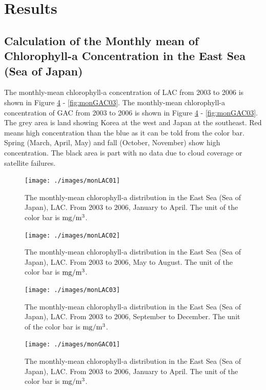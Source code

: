 \section{Results}

\subsection{Calculation of the Monthly mean of Chlorophyll-a Concentration in the East Sea (Sea of Japan)}
The monthly-mean chlorophyll-a concentration of LAC from 2003 to 2006 is shown in Figure \ref{fig:monGAC01} - \ref{fig:monGAC03}. The monthly-mean chlorophyll-a concentration of GAC from 2003 to 2006 is shown in Figure \ref{fig:monGAC01} - \ref{fig:monGAC03}. The grey area is land showing Korea at the west and Japan at the southeast. Red means high concentration than the blue as it can be told from the color bar. Spring (March, April, May) and fall (October, November) show high concentration. The black area is part with no data due to cloud coverage or satellite failures. 

\begin{figure}[p]
	\centering
	\texttt{[image: ./images/monLAC01]}\\
	\caption{The monthly-mean chlorophyll-a distribution in the East Sea (Sea of Japan), LAC. From 2003 to 2006, January to April. The unit of the color bar is $\rm mg/m^3$.}
	\label{fig:monLAC01}
\end{figure}


\begin{figure}[p]
	\centering
	\texttt{[image: ./images/monLAC02]}\\
	\caption{The monthly-mean chlorophyll-a distribution in the East Sea (Sea of Japan), LAC. From 2003 to 2006, May to August. The unit of the color bar is $\rm mg/m^3$.}
	\label{fig:monLAC02}
\end{figure}

\begin{figure}[p]
	\centering
	\texttt{[image: ./images/monLAC03]}\\
	\caption{The monthly-mean chlorophyll-a distribution in the East Sea (Sea of Japan), LAC. From 2003 to 2006, September to December. The unit of the color bar is $\rm mg/m^3$.}
	\label{fig:monLAC03}
\end{figure}


\begin{figure}[p]
	\centering
	\texttt{[image: ./images/monGAC01]}\\
	\caption{The monthly-mean chlorophyll-a distribution in the East Sea (Sea of Japan), LAC. From 2003 to 2006, January to April. The unit of the color bar is $\rm mg/m^3$.}
	\label{fig:monGAC01}
\end{figure}


